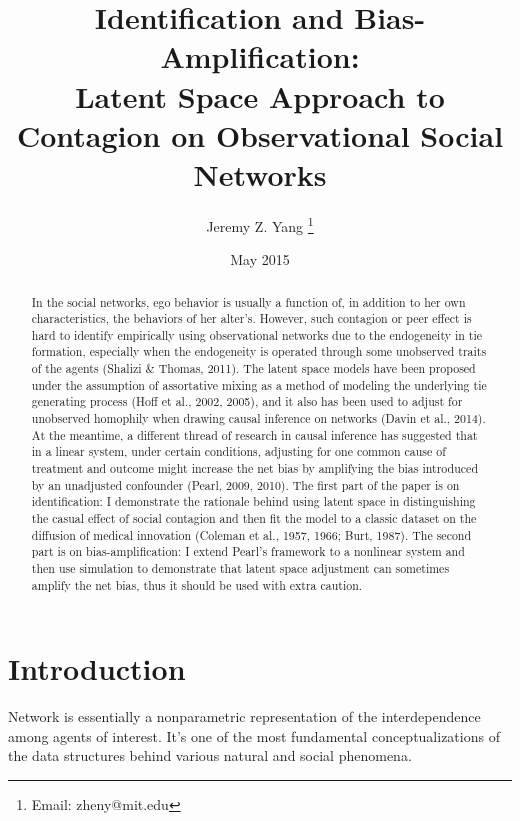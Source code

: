 \documentclass[11pt]{article}
\begin{document}
\title{Identification and Bias-Amplification: \\ Latent Space Approach to Contagion on Observational Social Networks}
\author{Jeremy Z. Yang \thanks{Email: zheny@mit.edu}}
\date{May 2015}
\maketitle


\begin{abstract}
In the social networks, ego behavior is usually a function of, in addition to her own characteristics, the behaviors of her alter's. However, such contagion or peer effect is hard to identify empirically using observational networks due to the endogeneity in tie formation, especially when the endogeneity is operated through some unobserved traits of the agents (Shalizi \& Thomas, 2011). The latent space models have been proposed under the assumption of assortative mixing as a method of modeling the underlying tie generating process (Hoff et al., 2002, 2005), and it also has been used to adjust for unobserved homophily when drawing causal inference on networks (Davin et al., 2014). At the meantime, a different thread of research in causal inference has suggested that in a linear system, under certain conditions, adjusting for one common cause of treatment and outcome might increase the net bias by amplifying the bias introduced by an unadjusted confounder (Pearl, 2009, 2010). The first part of the paper is on identification: I demonstrate the rationale behind using latent space in distinguishing the casual effect of social contagion and then fit the model to a classic dataset on the diffusion of medical innovation (Coleman et al., 1957, 1966; Burt, 1987). The second part is on bias-amplification: I extend Pearl's framework to a nonlinear system and then use simulation to demonstrate that latent space adjustment can sometimes amplify the net bias, thus it should be used with extra caution. 
\end{abstract}



\section{Introduction}

Network is essentially a nonparametric representation of the interdependence among agents of interest. It's one of the most fundamental conceptualizations of the data structures behind various natural and social phenomena.  \\
\end{document}
